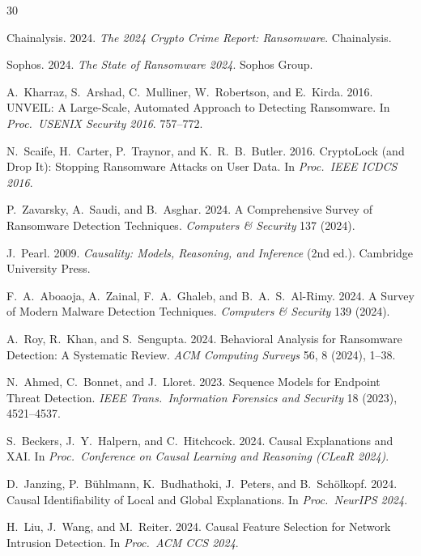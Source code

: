\documentclass[sigconf,nonacm]{acmart}
\begin{document}
\sloppy

\begin{thebibliography}{30}

Chainalysis. 2024. \textit{The 2024 Crypto Crime Report: Ransomware}.
Chainalysis.

Sophos. 2024. \textit{The State of Ransomware 2024}. Sophos Group.

A.~Kharraz, S.~Arshad, C.~Mulliner, W.~Robertson, and E.~Kirda. 2016.
UNVEIL: A Large-Scale, Automated Approach to Detecting Ransomware.
In \textit{Proc.\ USENIX Security 2016}. 757--772.

N.~Scaife, H.~Carter, P.~Traynor, and K.~R.~B.~Butler. 2016.
CryptoLock (and Drop It): Stopping Ransomware Attacks on User Data.
In \textit{Proc.\ IEEE ICDCS 2016}.

P.~Zavarsky, A.~Saudi, and B.~Asghar. 2024. A Comprehensive Survey of
Ransomware Detection Techniques. \textit{Computers \& Security} 137
(2024).

J.~Pearl. 2009. \textit{Causality: Models, Reasoning, and Inference}
(2nd ed.). Cambridge University Press.

F.~A.~Aboaoja, A.~Zainal, F.~A.~Ghaleb, and B.~A.~S.~Al-Rimy. 2024.
A Survey of Modern Malware Detection Techniques.
\textit{Computers \& Security} 139 (2024).

A.~Roy, R.~Khan, and S.~Sengupta. 2024. Behavioral Analysis for
Ransomware Detection: A Systematic Review. \textit{ACM Computing
Surveys} 56, 8 (2024), 1--38.

N.~Ahmed, C.~Bonnet, and J.~Lloret. 2023. Sequence Models for
Endpoint Threat Detection. \textit{IEEE Trans.\ Information Forensics
and Security} 18 (2023), 4521--4537.

S.~Beckers, J.~Y.~Halpern, and C.~Hitchcock. 2024. Causal Explanations
and XAI. In \textit{Proc.\ Conference on Causal Learning and
Reasoning (CLeaR 2024)}.

D.~Janzing, P.~B\"uhlmann, K.~Budhathoki, J.~Peters, and B.~Sch\"olkopf.
2024. Causal Identifiability of Local and Global Explanations. In
\textit{Proc.\ NeurIPS 2024}.

H.~Liu, J.~Wang, and M.~Reiter. 2024. Causal Feature Selection for
Network Intrusion Detection. In \textit{Proc.\ ACM CCS 2024}.


\end{thebibliography}
\end{document}
